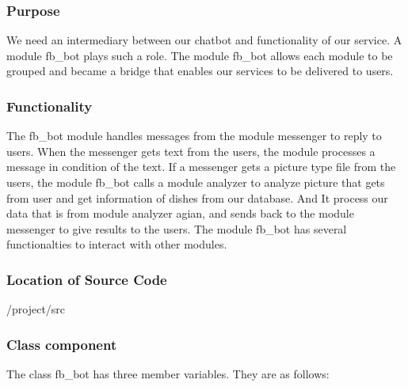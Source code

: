 \subsubsection {Purpose}

We need an intermediary between our chatbot and functionality of our service. A module fb\_bot plays such a role. The module fb\_bot allows each module to be grouped and became a bridge that enables our services to be delivered to users. \newline


\subsubsection {Functionality}

The fb\_bot module handles messages from the module messenger to reply to users. When the messenger gets text from the users, the module processes a message in condition of the text. If a messenger gets a picture type file from the users, the module fb\_bot calls a module analyzer to analyze picture that gets from user and get information of dishes from our database. And It process our data that is from module analyzer agian, and sends back to the module messenger to give results to the users. The module fb\_bot has several functionalties to interact with other modules. \newline


\subsubsection {Location of Source Code}

/project/src \newline


\subsubsection {Class component}

The class fb\_bot has three member variables. They are as follows:\newline

